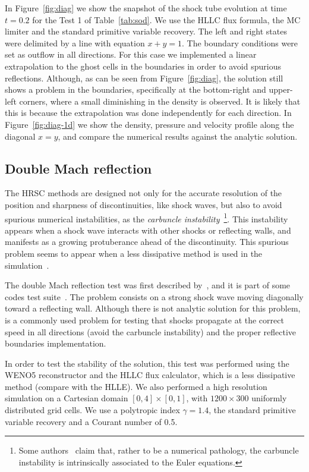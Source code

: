 In Figure~\ref{fig:diag} we show the snapshot of the shock tube evolution at time $t=0.2$ for the Test 1 of Table~\ref{tab:sod}. We use the HLLC flux formula, the MC limiter and the standard primitive variable recovery. The left and right states were delimited by a line with equation $x + y = 1$. The boundary conditions were set as outflow in all directions. For this case we implemented a linear extrapolation to the ghost cells in the boundaries in order to avoid spurious reflections. Although, as can be seen from Figure~\ref{fig:diag}, the solution still shows a problem in the boundaries, specifically at the bottom-right and upper-left corners, where a small diminishing in the density is observed. It is likely that this is because the extrapolation was done independently for each direction. In Figure~\ref{fig:diag-1d} we show the density, pressure and velocity profile along the diagonal $x=y$, and compare the numerical results against the analytic solution.


\subsection{Double Mach reflection}
\label{subsec:strongshock}

The HRSC methods are designed not only for the accurate resolution of the position and sharpness of discontinuities, like shock waves, but also to avoid spurious numerical instabilities, as the \textit{carbuncle instability}~\citep{rodionov2018}\footnote{Some authors~\citep[e.g.]{moschetta2001} claim that, rather to be a numerical pathology, the carbuncle instability is intrinsically associated to the Euler equations.}. This instability appears when a shock wave interacts with other shocks or reflecting walls, and manifests as a growing protuberance ahead of the discontinuity. This spurious problem seems to appear when a less dissipative method is used in the simulation~\citep{woodward1984}.

The double Mach reflection test was first described by~\citet[][]{woodward1984}, and it is part of some codes test suite~\citep[e.g.]{stone2008}. The problem consists on a strong shock wave moving diagonally toward a reflecting wall.
Although there is not analytic solution for this problem, is a commonly used problem for testing that shocks propagate at the correct speed in all directions (avoid the carbuncle instability) and the proper reflective boundaries implementation.

In order to test the stability of the solution, this test was performed using the WENO5 reconstructor and the HLLC flux calculator, which is a less dissipative method (compare with the HLLE). We also performed a high resolution simulation on a Cartesian domain $[0,4]\times[0,1]$, with $1200\times300$ uniformly distributed grid cells. We use a polytropic index $\gamma = 1.4$, the standard primitive variable recovery and a Courant number of 0.5.

